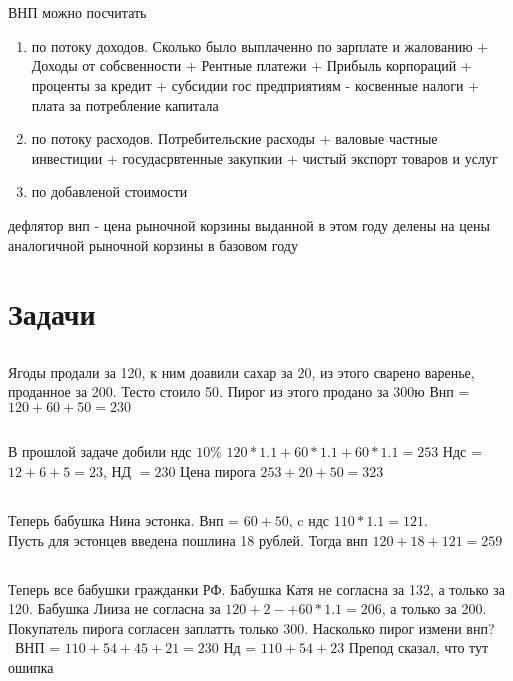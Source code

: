 \documentclass[14pt]{extarticle}
\begin{document}
\section{}
ВНП можно посчитать
\begin{enumerate}
    \item по потоку доходов. Сколько было выплаченно по зарплате и жалованию + Доходы от 
        собсвенности + Рентные платежи + Прибыль корпораций + проценты за кредит + субсидии гос предприятиям
        - косвенные налоги + плата за потребление капитала
    \item по потоку расходов. Потребительские расходы + валовые частные инвестиции +
        госудасрвтенные закупкии + чистый экспорт товаров и услуг
    \item по добавленой стоимости
\end{enumerate}
дефлятор внп - цена рыночной корзины выданной в этом году делены на цены аналогичной рыночной корзины в базовом году\\
\section{Задачи}
\subsection{}
Ягоды продали за 120, к ним доавили сахар за 20, из этого сварено варенье, проданное за 200. 
Тесто стоило 50. Пирог из этого продано за 300ю Внп = $120 + 60 + 50 = 230$
\subsection{}
В прошлой задаче добили ндс  $10\%$  $120*1.1 + 60 * 1.1 + 60 * 1.1 = 253$ Ндс =  $12+6 +5 = 23$, НД $=230$ 
Цена пирога $253 + 20 + 50 = 323$
\subsection{}
Теперь бабушка Нина эстонка. Внп =  $60 + 50$, c ндс  $110 * 1.1=121$.\\
Пусть для эстонцев введена пошлина 18 рублей. Тогда внп  $120 + 18 + 121 = 259$
\subsection{}
Теперь все бабушки гражданки РФ. Бабушка Катя не согласна за 132, а только за 120.
Бабушка Лииза не согласна за $120+2-+60*1.1 = 206$, а только за 200. Покупатель пирога согласен 
заплатть только 300. Насколько пирог  измени внп? \\\
ВНП =  $110 + 54 + 45 + 21 =  230$  Нд =  $110+54+23$ Препод сказал, что тут ошипка
\end{document}
